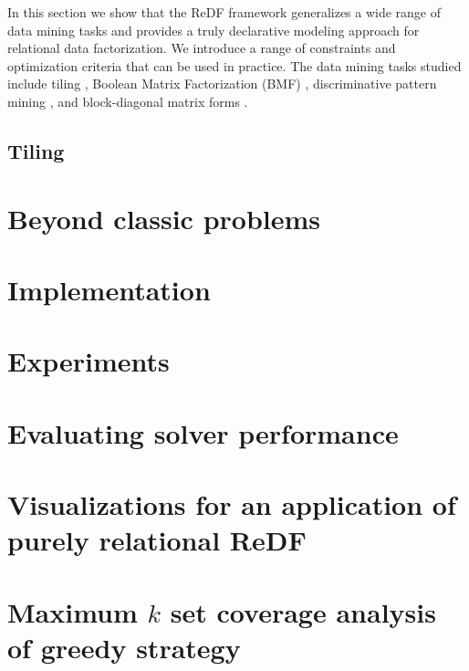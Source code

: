 In this section we show that the ReDF framework generalizes a wide range of data mining tasks and provides a truly declarative modeling approach for relational data factorization. We introduce a range of constraints and optimization criteria that can be used in practice. The data mining tasks studied include tiling \parencite{tiling},  Boolean Matrix Factorization (BMF) \parencite{dbp}, discriminative pattern mining \parencite{DBLP:conf/pkdd/KnobbeH06}, and block-diagonal matrix forms \parencite{blockdiagonal}.%

\subsection{Tiling}
\label{subsection:tiling}

\section{Beyond classic problems}
\label{subsection:beoynd}


\section{Implementation}
\label{section:implementation}


\section{Experiments}
\label{section:experiments}


\section{Evaluating solver performance}  \label{subsec:evaluatingsolver}


\section{Visualizations for an application of purely relational ReDF}\label{appendix:application_purel_relational}

\section{Maximum $k$ set coverage analysis of greedy strategy}\label{appendix:k_set_coverage_analysis}


